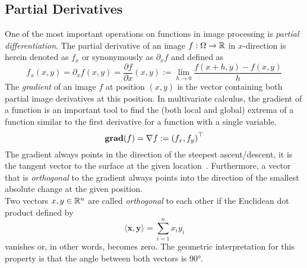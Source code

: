 \subsection{Partial Derivatives}
One of the most important operations on functions in image processing is \textit{partial
    differentiation}.
The partial derivative of an image $f: \Omega \rightarrow \mathbb{R}$ in $x$-direction is herein denoted as $f_x$ or
synonymously as $\partial_x f$ and defined as
\begin{equation}
    f_x(x, y) = \partial_x f (x, y) = \frac{\partial f}{\partial x} (x, y) := \lim_{h \to 0}\frac{f(x+h, y) -f(x, y)}{h} 
\end{equation}
The \textit{gradient} of an image $f$ at position $(x, y)$ is the vector containing both partial
image derivatives at this position.\newpage\noindent
In multivariate calculus, the gradient of a function is an important tool to find the (both local
and global) extrema of a function similar to the first derivative for a function with a single
variable.
\begin{equation}
    \textbf{grad}(f) = \mathbf{\nabla} f := {\left(f_x, f_y\right)}^\top\label{def:Grad}
\end{equation}
The gradient always points in the direction of the steepest ascent/descent, it is the tangent
vector to the surface at the given location~\cite{mfi3}. Furthermore, a vector that is
\textit{orthogonal} to the gradient always points into the direction of the smallest absolute
change at the given position.\\
Two vectors $x,y\in\mathbb{R}^n$ are called \textit{orthogonal} to each other if the Euclidean dot product defined by 
\begin{equation}\label{eq:EucDot}
    \langle\mathbf{x}, \mathbf{y}\rangle = \sum_{i=1}^n x_{i}y_i
\end{equation}
vanishes or, in other words, becomes zero.
The geometric interpretation for this property is that the angle between both vectors is 90°.

